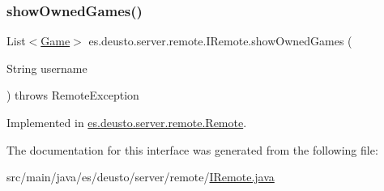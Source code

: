 \mbox{\label{interfacees_1_1deusto_1_1server_1_1remote_1_1_i_remote_aaaf6af5906c81cbd7b3b190a70ead98b}} 
\subsubsection{\texorpdfstring{show\+Owned\+Games()}{showOwnedGames()}}
{\footnotesize\ttfamily List$<$\hyperlink{classes_1_1deusto_1_1server_1_1db_1_1data_1_1_game}{Game}$>$ es.\+deusto.\+server.\+remote.\+I\+Remote.\+show\+Owned\+Games (\begin{DoxyParamCaption}\item[{String}]{username }\end{DoxyParamCaption}) throws Remote\+Exception}



Implemented in \hyperlink{classes_1_1deusto_1_1server_1_1remote_1_1_remote_a73569877f9317fc48a4e134977baa304}{es.\+deusto.\+server.\+remote.\+Remote}.



The documentation for this interface was generated from the following file\+:\begin{DoxyCompactItemize}
\item 
src/main/java/es/deusto/server/remote/\hyperlink{_i_remote_8java}{I\+Remote.\+java}\end{DoxyCompactItemize}
